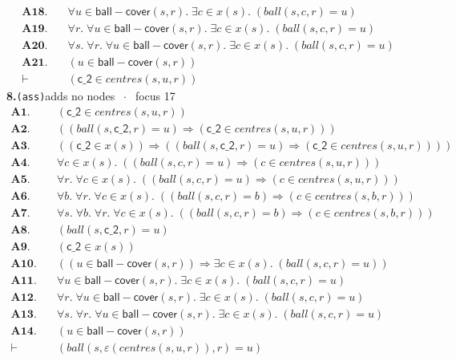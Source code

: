 \documentclass[11pt]{article}
\begin{document}
\begin{align*}
  \mathbf{A18.}\quad & \forall u \in \mathsf{ball{-}cover}(s, r).\; \exists c \in x(s).\; (\mathit{ball}(s, c, r) = u) \\
  \mathbf{A19.}\quad & \forall r.\; \forall u \in \mathsf{ball{-}cover}(s, r).\; \exists c \in x(s).\; (\mathit{ball}(s, c, r) = u) \\
  \mathbf{A20.}\quad & \forall s.\; \forall r.\; \forall u \in \mathsf{ball{-}cover}(s, r).\; \exists c \in x(s).\; (\mathit{ball}(s, c, r) = u) \\
  \mathbf{A21.}\quad & (u \in \mathsf{ball{-}cover}(s, r)) \\
  \vdash\quad & (\mathsf{c\_2} \in \mathit{centres}(s, u, r))
\end{align*}
\medskip\noindent\textbf{8.}\quad \texttt{(ass)}\hfill{\small adds no nodes $\;\cdot\;$ focus 17}\\[2pt]
\begin{align*}
  \mathbf{A1.}\quad & (\mathsf{c\_2} \in \mathit{centres}(s, u, r)) \\
  \mathbf{A2.}\quad & ((\mathit{ball}(s, \mathsf{c\_2}, r) = u) \Rightarrow (\mathsf{c\_2} \in \mathit{centres}(s, u, r))) \\
  \mathbf{A3.}\quad & ((\mathsf{c\_2} \in x(s)) \Rightarrow ((\mathit{ball}(s, \mathsf{c\_2}, r) = u) \Rightarrow (\mathsf{c\_2} \in \mathit{centres}(s, u, r)))) \\
  \mathbf{A4.}\quad & \forall c \in x(s).\; ((\mathit{ball}(s, c, r) = u) \Rightarrow (c \in \mathit{centres}(s, u, r))) \\
  \mathbf{A5.}\quad & \forall r.\; \forall c \in x(s).\; ((\mathit{ball}(s, c, r) = u) \Rightarrow (c \in \mathit{centres}(s, u, r))) \\
  \mathbf{A6.}\quad & \forall b.\; \forall r.\; \forall c \in x(s).\; ((\mathit{ball}(s, c, r) = b) \Rightarrow (c \in \mathit{centres}(s, b, r))) \\
  \mathbf{A7.}\quad & \forall s.\; \forall b.\; \forall r.\; \forall c \in x(s).\; ((\mathit{ball}(s, c, r) = b) \Rightarrow (c \in \mathit{centres}(s, b, r))) \\
  \mathbf{A8.}\quad & (\mathit{ball}(s, \mathsf{c\_2}, r) = u) \\
  \mathbf{A9.}\quad & (\mathsf{c\_2} \in x(s)) \\
  \mathbf{A10.}\quad & ((u \in \mathsf{ball{-}cover}(s, r)) \Rightarrow \exists c \in x(s).\; (\mathit{ball}(s, c, r) = u)) \\
  \mathbf{A11.}\quad & \forall u \in \mathsf{ball{-}cover}(s, r).\; \exists c \in x(s).\; (\mathit{ball}(s, c, r) = u) \\
  \mathbf{A12.}\quad & \forall r.\; \forall u \in \mathsf{ball{-}cover}(s, r).\; \exists c \in x(s).\; (\mathit{ball}(s, c, r) = u) \\
  \mathbf{A13.}\quad & \forall s.\; \forall r.\; \forall u \in \mathsf{ball{-}cover}(s, r).\; \exists c \in x(s).\; (\mathit{ball}(s, c, r) = u) \\
  \mathbf{A14.}\quad & (u \in \mathsf{ball{-}cover}(s, r)) \\
  \vdash\quad & (\mathit{ball}(s, \varepsilon(\mathit{centres}(s, u, r)), r) = u)
\end{align*}
\end{document}
